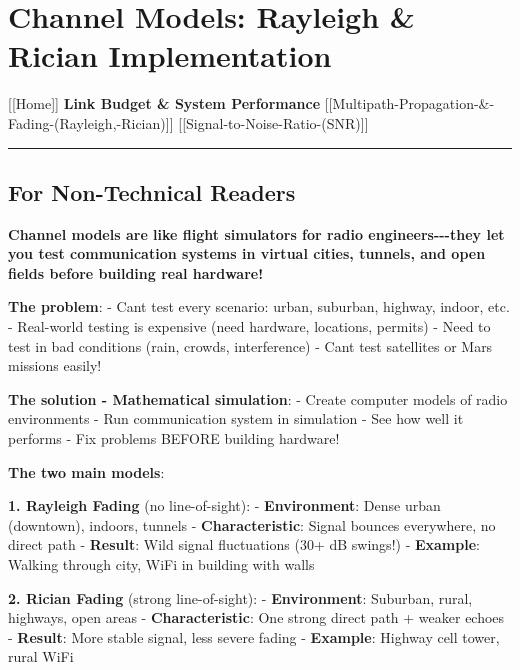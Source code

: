\section{Channel Models: Rayleigh \& Rician
Implementation}\label{channel-models-rayleigh-rician-implementation}

{[}{[}Home{]}{]} \textbar{} \textbf{Link Budget \& System Performance}
\textbar{}
{[}{[}Multipath-Propagation-\&-Fading-(Rayleigh,-Rician){]}{]}
\textbar{} {[}{[}Signal-to-Noise-Ratio-(SNR){]}{]}

\begin{center}\rule{0.5\linewidth}{0.5pt}\end{center}

\subsection{\texorpdfstring{ For Non-Technical
Readers}{ For Non-Technical Readers}}\label{for-non-technical-readers}

\textbf{Channel models are like flight simulators for radio
engineers-\/-\/-they let you test communication systems in virtual
cities, tunnels, and open fields before building real hardware!}

\textbf{The problem}: - Can\textquotesingle t test every scenario:
urban, suburban, highway, indoor, etc. - Real-world testing is expensive
(need hardware, locations, permits) - Need to test in bad conditions
(rain, crowds, interference) - Can\textquotesingle t test satellites or
Mars missions easily!

\textbf{The solution - Mathematical simulation}: - Create computer
models of radio environments - Run communication system in simulation -
See how well it performs - Fix problems BEFORE building hardware!

\textbf{The two main models}:

\textbf{1. Rayleigh Fading} (no line-of-sight): - \textbf{Environment}:
Dense urban (downtown), indoors, tunnels - \textbf{Characteristic}:
Signal bounces everywhere, no direct path - \textbf{Result}: Wild signal
fluctuations (30+ dB swings!) - \textbf{Example}: Walking through city,
WiFi in building with walls

\textbf{2. Rician Fading} (strong line-of-sight): -
\textbf{Environment}: Suburban, rural, highways, open areas -
\textbf{Characteristic}: One strong direct path + weaker echoes -
\textbf{Result}: More stable signal, less severe fading -
\textbf{Example}: Highway cell tower, rural WiFi

